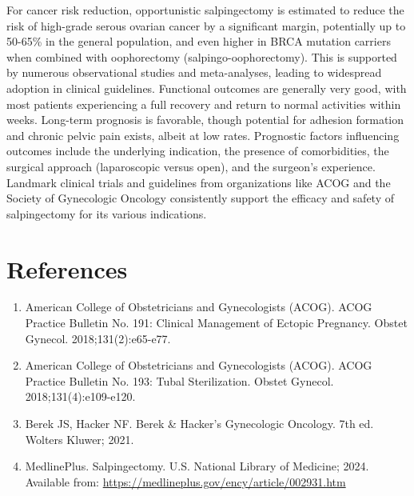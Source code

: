 For cancer risk reduction, opportunistic salpingectomy is estimated to reduce the risk of high-grade serous ovarian cancer by a significant margin, potentially up to 50-65\% in the general population, and even higher in BRCA mutation carriers when combined with oophorectomy (salpingo-oophorectomy). This is supported by numerous observational studies and meta-analyses, leading to widespread adoption in clinical guidelines. Functional outcomes are generally very good, with most patients experiencing a full recovery and return to normal activities within weeks. Long-term prognosis is favorable, though potential for adhesion formation and chronic pelvic pain exists, albeit at low rates. Prognostic factors influencing outcomes include the underlying indication, the presence of comorbidities, the surgical approach (laparoscopic versus open), and the surgeon's experience. Landmark clinical trials and guidelines from organizations like ACOG and the Society of Gynecologic Oncology consistently support the efficacy and safety of salpingectomy for its various indications.

\section*{References}
\begin{enumerate}
  \item American College of Obstetricians and Gynecologists (ACOG). ACOG Practice Bulletin No. 191: Clinical Management of Ectopic Pregnancy. Obstet Gynecol. 2018;131(2):e65-e77.
  \item American College of Obstetricians and Gynecologists (ACOG). ACOG Practice Bulletin No. 193: Tubal Sterilization. Obstet Gynecol. 2018;131(4):e109-e120.
  \item Berek JS, Hacker NF. Berek \& Hacker's Gynecologic Oncology. 7th ed. Wolters Kluwer; 2021.
  \item MedlinePlus. Salpingectomy. U.S. National Library of Medicine; 2024. Available from: \url{https://medlineplus.gov/ency/article/002931.htm}
\end{enumerate}

\clearpage
